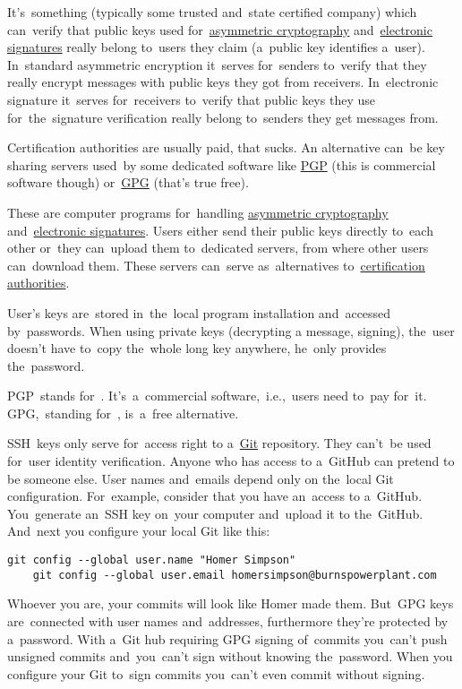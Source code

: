 \label{certificationauthority}
It's~something (typically some trusted and~state certified company) which can~verify that public keys used for~\hyperref[asymmetriccryptography]{asymmetric cryptography} and~\hyperref[electronicsignature]{electronic signatures} really belong to~users they claim (a~public key identifies a~user).
In~standard asymmetric encryption it~serves for~senders to~verify that they really encrypt messages with public keys they got from receivers.
In~electronic signature it~serves for~receivers to~verify that public keys they use for~the~signature verification really belong to~senders they get messages from.

Certification authorities are usually paid, that sucks.
An alternative can~be key sharing servers used~by some dedicated software like \hyperref[pgpgpg]{PGP} (this is commercial software though) or~\hyperref[pgpgpg]{GPG} (that's true free).

\label{pgpgpg}
These are computer programs for~handling \hyperref[asymmetriccryptography]{asymmetric cryptography} and~\hyperref[electronicsignature]{electronic signatures}.
Users either send their public keys directly to~each other or~they can~upload them to~dedicated servers, from where other users can~download them.
These servers can~serve as~alternatives to~\hyperref[certificationauthority]{certification authorities}.

User's keys are~stored in~the~local program installation and~accessed by~passwords.
When using private keys (decrypting a message, signing), the~user doesn't have to~copy the~whole long key anywhere, he~only provides the~password.

PGP~stands for~.
It's~a~commercial software,~i.e.,~users need to~pay for~it.
GPG,~standing for~, is~a~free alternative.

\label{gitgpg}
SSH~keys only serve for~access right to a~\hyperref[git]{Git} repository.
They can't~be used for~user identity verification.
Anyone who has access to a~GitHub can pretend to be someone else.
User names and~emails depend only on the~local Git configuration.
For~example, consider that you have an~access to a~GitHub.
You~generate an~SSH key on~your computer and~upload it to the~GitHub.
And~next you configure your local Git like this:
\begin{lstlisting}[frame=no]
    git config --global user.name "Homer Simpson"
    git config --global user.email homersimpson@burnspowerplant.com
\end{lstlisting}
\noindent Whoever you are, your commits will look like Homer made them.
But~GPG keys are~connected with user names and~addresses, furthermore they're protected by a~password.
With a~Git hub requiring GPG signing of~commits you~can't push unsigned commits and~you~can't sign without knowing the~password.
When you configure your Git to~sign commits you~can't even commit without signing.

